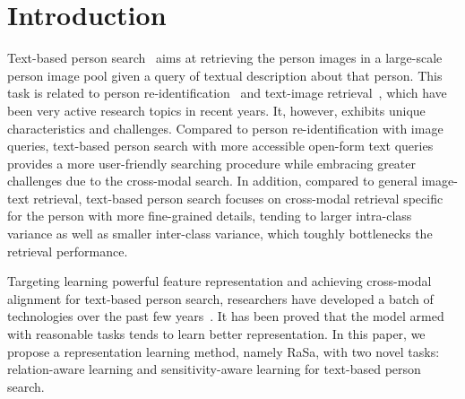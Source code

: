\documentclass{article}
\begin{document}
\section{Introduction}
Text-based person search~\cite{li2017person,wang2021text} aims at retrieving the person images in a large-scale person image pool given a query of textual description about that person.
This task is related to person re-identification~\cite{ji2021context,wang2022pose} and text-image retrieval~\cite{ijcai2022-759,NEURIPS2021_50525975}, which have been very active research topics in recent years.
It, however, exhibits unique characteristics and challenges.
Compared to person re-identification with image queries, text-based person search with more accessible open-form text queries provides a more user-friendly searching procedure while embracing greater challenges due to the cross-modal search.
In addition, compared to general image-text retrieval, text-based person search focuses on cross-modal retrieval specific for the person with more fine-grained details, tending to larger intra-class variance as well as smaller inter-class variance, which toughly bottlenecks the retrieval performance.

Targeting learning powerful feature representation and achieving cross-modal alignment for text-based person search, 
researchers have developed a batch of technologies over the past few years~\cite{wu2021lapscore,shao2022learning}.
It has been proved that the model armed with reasonable tasks tends to learn better representation.  
In this paper, we propose a representation learning method, namely RaSa, with two novel tasks: relation-aware learning and sensitivity-aware learning for text-based person search.  
\end{document}
